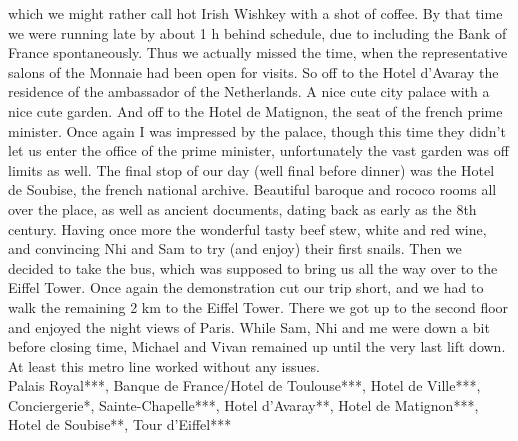 which we might rather call hot Irish Wishkey with a shot of coffee. By that time we were running late by about 1 h behind schedule, due to including the Bank of France spontaneously. Thus we actually missed the time, when the representative salons of the Monnaie had been open for visits. So off to the Hotel d'Avaray the residence of the ambassador of the Netherlands. A nice cute city palace with a nice cute garden. And off to the Hotel de Matignon, the seat of the french prime minister. Once again I was impressed by the palace, though this time they didn't let us enter the office of the prime minister, unfortunately the vast garden was off limits as well. The final stop of our day (well final before dinner) was the Hotel de Soubise, the french national archive. Beautiful baroque and rococo rooms all over the place, as well as ancient documents, dating back as early as the 8th century. Having once more the wonderful tasty beef stew, white and red wine, and convincing Nhi and Sam to try (and enjoy) their first snails. Then we decided to take the bus, which was supposed to bring us all the way over to the Eiffel Tower. Once again the demonstration cut our trip short, and we had to walk the remaining 2 km to the Eiffel Tower. There we got up to the second floor and enjoyed the night views of Paris. While Sam, Nhi and me were down a bit before closing time, Michael and Vivan remained up until the very last lift down. At least this metro line worked without any issues.\\

Palais Royal***, Banque de France/Hotel de Toulouse***, Hotel de Ville***, Conciergerie*, Sainte-Chapelle***, Hotel d'Avaray**, Hotel de Matignon***, Hotel de Soubise**, Tour d'Eiffel***\\

